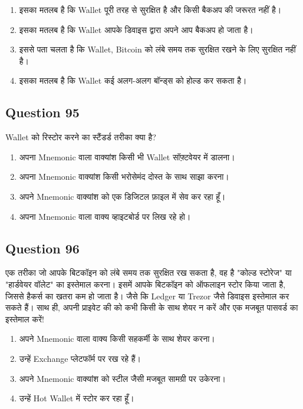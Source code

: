 \documentclass[12pt,a4paper]{article}
\begin{document}
\begin{enumerate}[label=\Alph*., leftmargin=*]
\item इसका मतलब है कि Wallet पूरी तरह से सुरक्षित है और किसी बैकअप की जरूरत नहीं है।
\item इसका मतलब है कि Wallet आपके डिवाइस द्वारा अपने आप बैकअप हो जाता है।
\item इससे पता चलता है कि Wallet, Bitcoin को लंबे समय तक सुरक्षित रखने के लिए सुरक्षित नहीं है।
\item इसका मतलब है कि Wallet कई अलग-अलग बॉन्ड्स को होल्ड कर सकता है।
\end{enumerate}

\bigskip


\subsection*{Question 95}
Wallet को रिस्टोर करने का स्टैंडर्ड तरीका क्या है?

\begin{enumerate}[label=\Alph*., leftmargin=*]
\item अपना Mnemonic वाला वाक्यांश किसी भी Wallet सॉफ़्टवेयर में डालना।
\item अपना Mnemonic वाक्यांश किसी भरोसेमंद दोस्त के साथ साझा करना।
\item अपने Mnemonic वाक्यांश को एक डिजिटल फ़ाइल में सेव कर रहा हूँ।
\item अपना Mnemonic वाला वाक्य व्हाइटबोर्ड पर लिख रहे हो।
\end{enumerate}

\bigskip


\subsection*{Question 96}
एक तरीका जो आपके बिटकॉइन को लंबे समय तक सुरक्षित रख सकता है, वह है "कोल्ड स्टोरेज" या "हार्डवेयर वॉलेट" का इस्तेमाल करना। इसमें आपके बिटकॉइन को ऑफलाइन स्टोर किया जाता है, जिससे हैकर्स का खतरा कम हो जाता है। जैसे कि Ledger या Trezor जैसे डिवाइस इस्तेमाल कर सकते हैं। साथ ही, अपनी प्राइवेट की को कभी किसी के साथ शेयर न करें और एक मजबूत पासवर्ड का इस्तेमाल करें!

\begin{enumerate}[label=\Alph*., leftmargin=*]
\item अपने Mnemonic वाला वाक्य किसी सहकर्मी के साथ शेयर करना।
\item उन्हें Exchange प्लेटफॉर्म पर रख रहे हैं।
\item अपने Mnemonic वाक्यांश को स्टील जैसी मजबूत सामग्री पर उकेरना।
\item उन्हें Hot Wallet में स्टोर कर रहा हूँ।
\end{enumerate}
\end{document}
